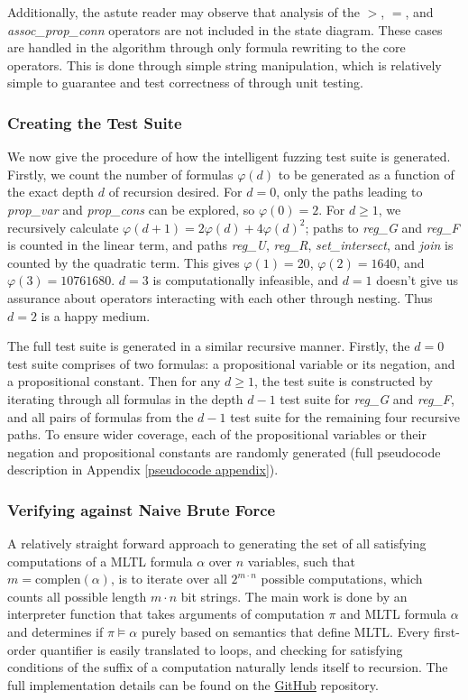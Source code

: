 \documentclass[runningheads]{llncs}
\renewcommand{\phi}{\varphi}
\begin{document}
Additionally, the astute reader may observe that analysis of the $>$, $=$, and \textit{assoc\_prop\_conn} operators are not included in the state diagram. 
These cases are handled in the algorithm through only formula rewriting to the core operators. This is done through simple string manipulation, which is relatively simple to guarantee and test correctness of through unit testing.

\subsubsection{Creating the Test Suite}
 We now give the procedure of how the intelligent fuzzing test suite is generated. 
Firstly, we count the number of formulas $\phi(d)$ to be generated as a function of the exact depth $d$ of recursion desired. 
For $d = 0$, only the paths leading to \textit{prop\_var} and \textit{prop\_cons} can be explored, so $\phi(0) = 2$. For $d \geq 1$, we recursively calculate $\phi(d + 1) = 2\phi(d) + 4\phi(d)^2$; paths to \textit{reg\_G} and \textit{reg\_F} is counted in the linear term, and paths \textit{reg\_U}, \textit{reg\_R}, \textit{set\_intersect}, and \textit{join} is counted by the quadratic term. 
This gives $\phi(1) = 20$, $\phi(2) = 1640$, and $\phi(3) = 10761680$. 
$d = 3$ is computationally infeasible, and $d = 1$ doesn't give us assurance about operators interacting with each other through nesting. Thus $d = 2$ is a happy medium. 

The full test suite is generated in a similar recursive manner. 
Firstly, the $d = 0$ test suite comprises of two formulas: a propositional variable or its negation, and a propositional constant. 
Then for any $d \geq 1$, the test suite is constructed by iterating through all formulas in the depth $d-1$ test suite for \textit{reg\_G} and \textit{reg\_F}, and all pairs of formulas from the $d-1$ test suite for the remaining four recursive paths. 
To ensure wider coverage, each of the propositional variables or their negation and propositional constants are randomly generated (full pseudocode description in Appendix \ref{pseudocode appendix}).

\subsubsection{Verifying against Naive Brute Force}
 A relatively straight forward approach to generating the set of all satisfying computations of a MLTL formula $\alpha$ over $n$ variables, such that $m = \text{complen}(\alpha)$, is to iterate over all $2^{m \cdot n}$ possible computations, which counts all possible length $m \cdot n$ bit strings. 
The main work is done by an interpreter function that takes arguments of computation $\pi$ and MLTL formula $\alpha$ and determines if $\pi \vDash \alpha$ purely based on semantics that define MLTL.
Every first-order quantifier is easily translated to loops, and checking for satisfying conditions of the suffix of a computation naturally lends itself to recursion.
The full implementation details can be found on the \href{https://github.com/zwang271/2022-Iowa-State-REU-Temporal-Logic-.git}{GitHub} repository. 
\end{document}
